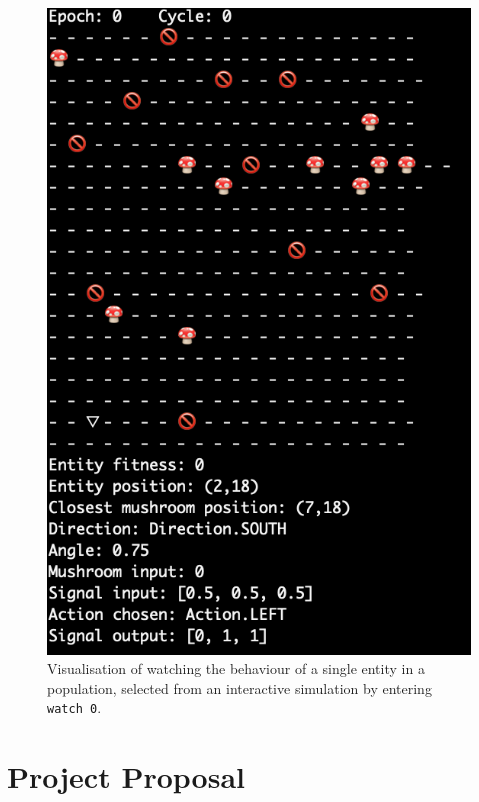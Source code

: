\documentclass[12pt,a4paper]{report}
\begin{document}
\begin{figure}[ht]
  \centering
  \includegraphics[width=.9\linewidth]{figs/interactivesingle}
  \caption{Visualisation of watching the behaviour of a single entity in a population, selected from an interactive simulation by entering \texttt{watch 0}.}
  \label{fig:interactivesingle}
\end{figure}


\chapter{Project Proposal}


\end{document}
